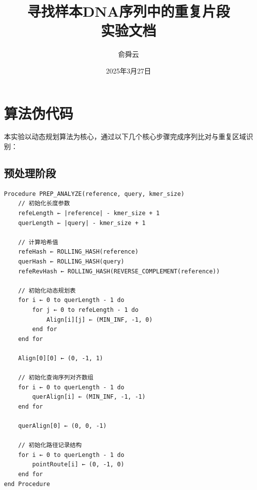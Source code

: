 \documentclass[12pt, a4paper, oneside]{ctexart}
\title{\textbf{寻找样本DNA序列中的重复片段\\ 实验文档}}
\author{俞舜云\quad24300240045}
\date{2025年3月27日}
\begin{document}
	\maketitle

    \section{算法伪代码}
    本实验以动态规划算法为核心，通过以下几个核心步骤完成序列比对与重复区域识别：

    \subsection{预处理阶段}
    \begin{lstlisting}[language=Algol, basicstyle=\small\ttfamily]
Procedure PREP_ANALYZE(reference, query, kmer_size)
    // 初始化长度参数
    refeLength ← |reference| - kmer_size + 1
    querLength ← |query| - kmer_size + 1
    
    // 计算哈希值
    refeHash ← ROLLING_HASH(reference)
    querHash ← ROLLING_HASH(query)
    refeRevHash ← ROLLING_HASH(REVERSE_COMPLEMENT(reference))
    
    // 初始化动态规划表
    for i ← 0 to querLength - 1 do
        for j ← 0 to refeLength - 1 do
            Align[i][j] ← (MIN_INF, -1, 0)
        end for
    end for
    
    Align[0][0] ← (0, -1, 1)
    
    // 初始化查询序列对齐数组
    for i ← 0 to querLength - 1 do
        querAlign[i] ← (MIN_INF, -1, -1)
    end for
    
    querAlign[0] ← (0, 0, -1)
    
    // 初始化路径记录结构
    for i ← 0 to querLength - 1 do
        pointRoute[i] ← (0, -1, 0)
    end for
end Procedure
        \end{lstlisting}
        
\end{document}
